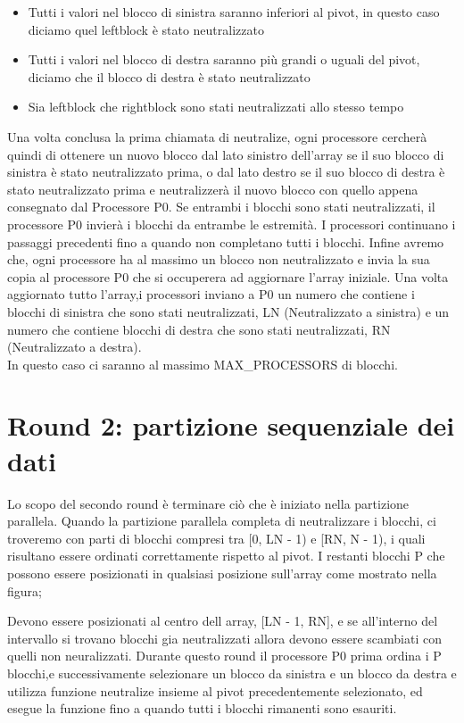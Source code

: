 \begin{itemize}
\item Tutti i valori nel blocco di sinistra saranno inferiori al pivot, in questo caso diciamo quel leftblock è stato neutralizzato
\item Tutti i valori nel blocco di destra saranno più grandi o uguali
del pivot, diciamo che il blocco di destra è stato neutralizzato
\item Sia leftblock che rightblock sono stati neutralizzati allo stesso
tempo
\end{itemize}
 
Una volta conclusa la prima chiamata di neutralize, ogni processore cercherà quindi di ottenere un nuovo blocco dal lato sinistro dell'array se il suo blocco di sinistra è stato neutralizzato prima, o dal lato destro se il suo blocco di destra è stato neutralizzato prima e neutralizzerà il nuovo blocco con quello appena consegnato dal Processore P0. Se entrambi i blocchi sono stati neutralizzati, il processore P0 invierà i blocchi da entrambe le estremità. I processori continuano i passaggi precedenti fino a quando non completano tutti i blocchi. Infine avremo che, ogni processore ha al massimo un blocco non neutralizzato
e invia la sua copia al processore P0 che si occuperera ad aggiornare l'array iniziale.
Una volta aggiornato tutto l'array,i processori inviano a P0 un numero che contiene i blocchi di sinistra che sono stati neutralizzati, LN (Neutralizzato a sinistra) e un numero che contiene blocchi di destra che sono stati neutralizzati, RN (Neutralizzato a destra).\\
In questo caso ci saranno al massimo MAX\_PROCESSORS di blocchi.

\section{Round 2: partizione sequenziale dei dati} 

Lo scopo del secondo round è terminare ciò che è iniziato nella partizione parallela.
Quando la partizione parallela completa di neutralizzare i blocchi, ci troveremo con parti di blocchi  compresi tra [0, LN - 1) e [RN, N - 1), i quali risultano essere ordinati correttamente rispetto al pivot. I restanti blocchi P che possono essere posizionati in qualsiasi posizione sull'array come mostrato nella figura;



Devono essere posizionati al centro dell array, [LN - 1, RN], e se all'interno del intervallo si trovano blocchi gia neutralizzati allora devono essere scambiati con quelli non neuralizzati. Durante questo  round il processore P0 prima ordina i P blocchi,e successivamente selezionare un blocco da sinistra e un blocco da destra e utilizza funzione neutralize insieme al pivot precedentemente selezionato, ed esegue la funzione fino a quando tutti i blocchi rimanenti sono esauriti.
 
